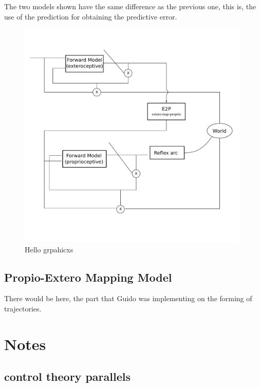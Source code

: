 \documentclass[11pt]{llncs}
\begin{document}
The two models shown have the same difference as the previous one, this is,
the use of the prediction for obtaining the predictive error.


\begin{figure}
  \includegraphics[width=0.99\textwidth]{img/actinf_large_diagram_p_e2p_e.pdf}
  \caption{Hello grpahicxs}
\end{figure}

\subsection{Propio-Extero Mapping Model}
\label{subsec:exteropropio}


There would be here, the part that Guido was implementing on the forming of trajectories.




\section{Notes}
\label{sec:org863d8de}

\subsection{control theory parallels}
\label{sec:org316353f}
\end{document}
